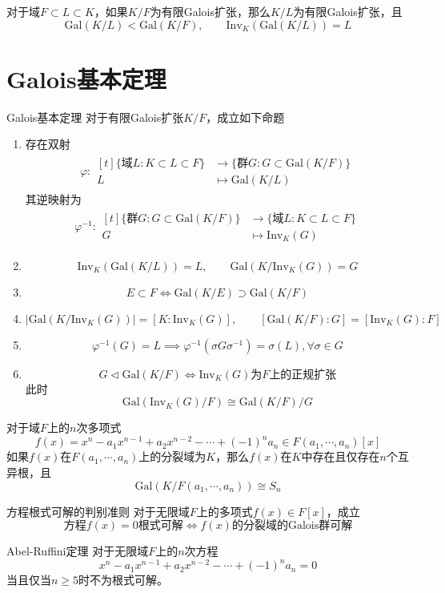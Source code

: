 \documentclass[lang = cn, scheme = chinese, thmcnt = section]{elegantbook}
\newcommand{\sub}{\subset}             %
\begin{document}
\begin{proposition}
	对于域$F\sub L\sub K$，如果$K/F$为有限Galois扩张，那么$K/L$为有限Galois扩张，且
	$$
	\text{Gal}(K/L)<\text{Gal}(K/F),\qquad 
	\text{Inv}_K(\text{Gal}(K/L))=L
	$$
\end{proposition}

\section{Galois基本定理}

\begin{theorem}{Galois基本定理}
	对于有限Galois扩张$K/F$，成立如下命题
	\begin{enumerate}
		\item 存在双射
		\begin{align*}
			\varphi:\begin{aligned}[t]
				\{ \text{域}L:K\sub L\sub F \}&\longrightarrow \{ \text{群}G:G\sub \text{Gal}(K/F) \}\\
				L&\longmapsto \text{Gal}(K/L)
			\end{aligned}
		\end{align*}
		其逆映射为
		\begin{align*}
			\varphi^{-1}:\begin{aligned}[t]
				\{ \text{群}G:G\sub \text{Gal}(K/F) \}&\longrightarrow \{ \text{域}L:K\sub L\sub F \}\\
				G&\longmapsto \text{Inv}_K(G)
			\end{aligned}
		\end{align*}
		\item 
		$$
		\text{Inv}_K(\text{Gal}(K/L))=L,\qquad 
		\text{Gal}(K/\text{Inv}_K(G))=G
		$$
		\item 
		$$
		E\sub F\iff \text{Gal}(K/E)\supset\text{Gal}(K/F)
		$$
		\item 
		$$
		|\text{Gal}(K/\text{Inv}_K(G))|=[K:\text{Inv}_K(G)],\qquad 
		[\text{Gal}(K/F):G]=[\text{Inv}_K(G):F]
		$$
		\item 
		$$
		\varphi^{-1}(G)=L\implies \varphi^{-1}(\sigma G\sigma^{-1})=\sigma(L),\forall \sigma\in G
		$$
		\item 
		$$
		G\lhd \text{Gal}(K/F)\iff \text{Inv}_K(G)\text{为}F\text{上的正规扩张}
		$$
		此时
		$$
		\text{Gal}(\text{Inv}_K(G)/F)\cong \text{Gal}(K/F)/G
		$$
	\end{enumerate}
\end{theorem}

\begin{theorem}
	对于域$F$上的$n$次多项式
	$$
	f(x)=x^n-a_1x^{n-1}+a_2x^{n-2}-\cdots+(-1)^na_n\in F(a_1,\cdots,a_n)[x]
	$$
	如果$f(x)$在$F(a_1,\cdots,a_n)$上的分裂域为$K$，那么$f(x)$在$K$中存在且仅存在$n$个互异根，且
	$$
	\text{Gal}(K/F(a_1,\cdots,a_n))\cong S_n
	$$
\end{theorem}

\begin{theorem}{方程根式可解的判别准则}
	对于无限域$F$上的多项式$f(x)\in F[x]$，成立
	$$
	\text{方程}f(x)=0\text{根式可解}\iff f(x)\text{的分裂域的Galois群可解}
	$$
\end{theorem}

\begin{theorem}{Abel-Ruffini定理}
	对于无限域$F$上的$n$次方程
	$$
	x^n-a_1x^{n-1}+a_2x^{n-2}-\cdots+(-1)^na_n=0
	$$
	当且仅当$n\ge 5$时不为根式可解。
\end{theorem}
\end{document}
